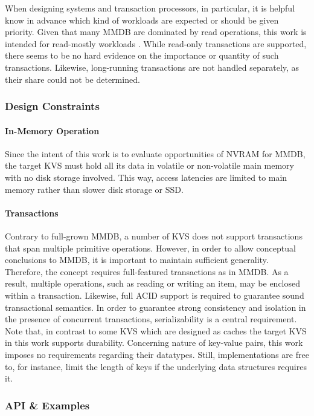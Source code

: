 When designing systems and transaction processors, in particular, it is helpful
know in advance which kind of workloads are expected or should be given
priority. Given that many MMDB are dominated by read operations, this work is
intended for read-mostly workloads \cite{andrei2017sap}. While read-only
transactions are supported, there seems to be no hard evidence on the importance
or quantity of such transactions. Likewise, long-running transactions are not
handled separately, as their share could not be determined.

\subsubsection{Design Constraints}

\paragraph{In-Memory Operation}

Since the intent of this work is to evaluate opportunities of NVRAM for MMDB,
the target KVS must hold all its data in volatile or non-volatile main memory
with no disk storage involved. This way, access latencies are limited to main
memory rather than slower disk storage or SSD.

\paragraph{Transactions}

Contrary to full-grown MMDB, a number of KVS does not support transactions that
span multiple primitive operations. However, in order to allow conceptual
conclusions to MMDB, it is important to maintain sufficient generality.
Therefore, the concept requires full-featured transactions as in MMDB. As a
result, multiple operations, such as reading or writing an item, may be enclosed
within a transaction. Likewise, full ACID support is required to guarantee sound
transactional semantics. In order to guarantee strong consistency and isolation
in the presence of concurrent transactions, serializability is a central
requirement. Note that, in contrast to some KVS which are designed as caches the
target KVS in this work supports durability. Concerning nature of key-value
pairs, this work imposes no requirements regarding their datatypes. Still,
implementations are free to, for instance, limit the length of keys if the
underlying data structures requires it.

\subsubsection{API \& Examples}

